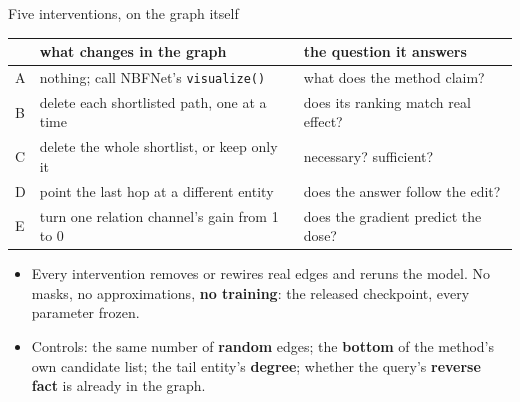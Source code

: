 \documentclass[aspectratio=169,11pt]{beamer}
\begin{document}
\begin{frame}{Five interventions, on the graph itself}
\begin{center}\small
\begin{tabular}{lll}
\toprule
 & what changes in the graph & the question it answers \\
\midrule
A & nothing; call NBFNet's \texttt{visualize()} & what does the method claim? \\
B & delete each shortlisted path, one at a time & does its ranking match real effect? \\
C & delete the whole shortlist, or keep only it & necessary? sufficient? \\
D & point the last hop at a different entity & does the answer follow the edit? \\
E & turn one relation channel's gain from 1 to 0 & does the gradient predict the dose? \\
\bottomrule
\end{tabular}
\end{center}
\vspace{0.3em}
\begin{itemize}\small
  \item Every intervention removes or rewires real edges and reruns the model. No
        masks, no approximations, \textbf{no training}: the released checkpoint,
        every parameter frozen.
  \item Controls: the same number of \textbf{random} edges; the \textbf{bottom}
        of the method's own candidate list; the tail entity's \textbf{degree};
        whether the query's \textbf{reverse fact} is already in the graph.
\end{itemize}
\end{frame}
\end{document}
